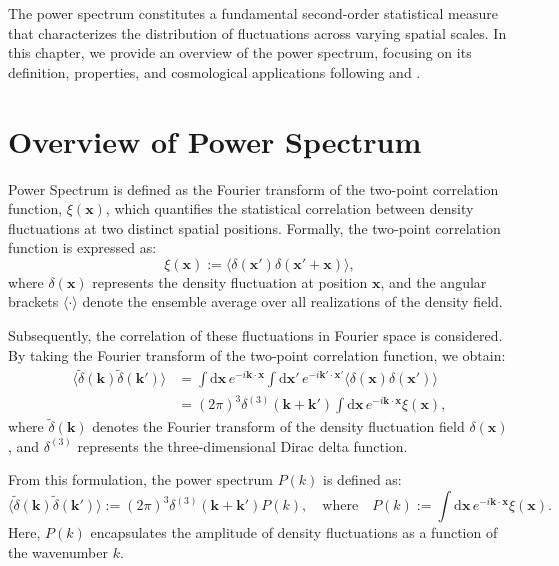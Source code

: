 The power spectrum constitutes a fundamental second-order statistical measure that characterizes the distribution of fluctuations across varying spatial scales. 
In this chapter, we provide an overview of the power spectrum, focusing on its definition, properties, and cosmological applications following \citet{2000PhRvD..62d3007H} and \citet{2017MNRAS.472.2126K}.

\section{Overview of Power Spectrum}
Power Spectrum is defined as the Fourier transform of the two-point correlation function, $\xi(\mathbf{x})$, which quantifies the statistical correlation between density fluctuations at two distinct spatial positions. Formally, the two-point correlation function is expressed as:
\begin{equation}
    \xi(\mathbf{x}) := \langle \delta(\mathbf{x}') \delta(\mathbf{x}' + \mathbf{x}) \rangle,
    \label{eq:correlation}
\end{equation}
where $\delta(\mathbf{x})$ represents the density fluctuation at position $\mathbf{x}$, and the angular brackets $\langle \cdot \rangle$ denote the ensemble average over all realizations of the density field.

Subsequently, the correlation of these fluctuations in Fourier space is considered. By taking the Fourier transform of the two-point correlation function, we obtain:
\begin{equation}
    \begin{split}
        \langle \tilde{\delta}(\mathbf{k}) \tilde{\delta}(\mathbf{k}') \rangle &= \int \mathrm{d}\mathbf{x}\, e^{-i\mathbf{k} \cdot \mathbf{x}} \int \mathrm{d}\mathbf{x}'\, e^{-i\mathbf{k}' \cdot \mathbf{x}'} \langle \delta(\mathbf{x}) \delta(\mathbf{x}') \rangle \\
        &= (2\pi)^3 \delta^{(3)}(\mathbf{k} + \mathbf{k}') \int \mathrm{d}\mathbf{x}\, e^{-i\mathbf{k} \cdot \mathbf{x}} \xi(\mathbf{x}),
    \end{split}
    \label{eq:power_spectrum_definition}
\end{equation}
where $\tilde{\delta}(\mathbf{k})$ denotes the Fourier transform of the density fluctuation field $\delta(\mathbf{x})$, and $\delta^{(3)}$ represents the three-dimensional Dirac delta function.

From this formulation, the power spectrum $P(k)$ is defined as:
\begin{equation}
    \langle \tilde{\delta}(\mathbf{k}) \tilde{\delta}(\mathbf{k}') \rangle := (2\pi)^3 \delta^{(3)}(\mathbf{k} + \mathbf{k}') P(k), \quad \text{where} \quad P(k) := \int \mathrm{d}\mathbf{x}\, e^{-i\mathbf{k} \cdot \mathbf{x}} \xi(\mathbf{x}).
    \label{eq:power_spectrum}
\end{equation}
Here, $P(k)$ encapsulates the amplitude of density fluctuations as a function of the wavenumber $k$.

